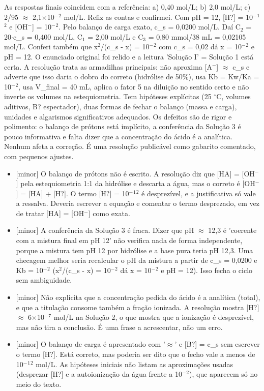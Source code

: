\documentclass{article}%
\begin{document}
As respostas finais coincidem com a referência: a) 0,40 mol/L; b) 2,0 mol/L; c) 2/95 $\approx$ 2,1$\times$10$^{-}$$^2$ mol/L. Refiz as contas e confirmei. Com pH = 12, {[}H?{]} = 10$^{-}$$^{1}$$^2$ e {[}OH$^{-}${]} = 10$^{-}$$^2$. Pelo balanço de carga exato, c\_s = 0,0200 mol/L. Daí C$_{2}$ = 20$\cdot$c\_s = 0,400 mol/L, C$_{1}$ = 2,00 mol/L e C$_{3}$ = 0,80 mmol/38 mL = 0,02105 mol/L. Conferi também que x$^2$/(c\_s - x) = 10$^{-}$$^2$ com c\_s = 0,02 dá x = 10$^{-}$$^2$ e pH = 12. O enunciado original foi relido e a leitura 'Solução I' = Solução 1 está certa. A resolução trata as armadilhas principais: não aproxima {[}A$^{-}${]} $\approx$ c\_s e adverte que isso daria o dobro do correto (hidrólise de 50\%), usa Kb = Kw/Ka = 10$^{-}$$^2$, usa V\_final = 40 mL, aplica o fator 5 na diluição no sentido certo e não inverte os volumes na estequiometria. Tem hipóteses explícitas (25 $^\circ$C, volumes aditivos, B? espectador), duas formas de fechar o balanço (massa e carga), unidades e algarismos significativos adequados. Os defeitos são de rigor e polimento: o balanço de prótons está implícito, a conferência da Solução 3 é pouco informativa e falta dizer que a concentração do ácido é a analítica. Nenhum afeta a correção. É uma resolução publicável como gabarito comentado, com pequenos ajustes.%
\begin{itemize}%
\item%
{[}minor{]} O balanço de prótons não é escrito. A resolução diz que {[}HA{]} = {[}OH$^{-}${]} pela estequiometria 1:1 da hidrólise e descarta a água, mas o correto é {[}OH$^{-}${]} = {[}HA{]} + {[}H?{]}. O termo {[}H?{]} = 10$^{-}$$^{1}$$^2$ é desprezível, e a justificativa só vale a ressalva. Deveria escrever a equação e comentar o termo desprezado, em vez de tratar {[}HA{]} = {[}OH$^{-}${]} como exata.%
\item%
{[}minor{]} A conferência da Solução 3 é fraca. Dizer que pH $\approx$ 12,3 é 'coerente com a mistura final em pH 12' não verifica nada de forma independente, porque a mistura tem pH 12 por hidrólise e a base pura teria pH 12,3. Uma checagem melhor seria recalcular o pH da mistura a partir de c\_s = 0,0200 e Kb = 10$^{-}$$^2$ (x$^2$/(c\_s - x) = 10$^{-}$$^2$ dá x = 10$^{-}$$^2$ e pH = 12). Isso fecha o ciclo sem ambiguidade.%
\item%
{[}minor{]} Não explicita que a concentração pedida do ácido é a analítica (total), e que a titulação consome também a fração ionizada. A resolução mostra {[}H?{]} $\approx$ 6$\times$10$^{-}$$^{7}$ mol/L na Solução 2, o que mostra que a ionização é desprezível, mas não tira a conclusão. É uma frase a acrescentar, não um erro.%
\item%
{[}minor{]} O balanço de carga é apresentado com '$\approx$' e {[}B?{]} = c\_s sem escrever o termo {[}H?{]}. Está correto, mas poderia ser dito que o fecho vale a menos de 10$^{-}$$^{1}$$^2$ mol/L. As hipóteses iniciais não listam as aproximações usadas (desprezar {[}H?{]} e a autoionização da água frente a 10$^{-}$$^2$), que aparecem só no meio do texto.%
\end{itemize}%
\end{document}
